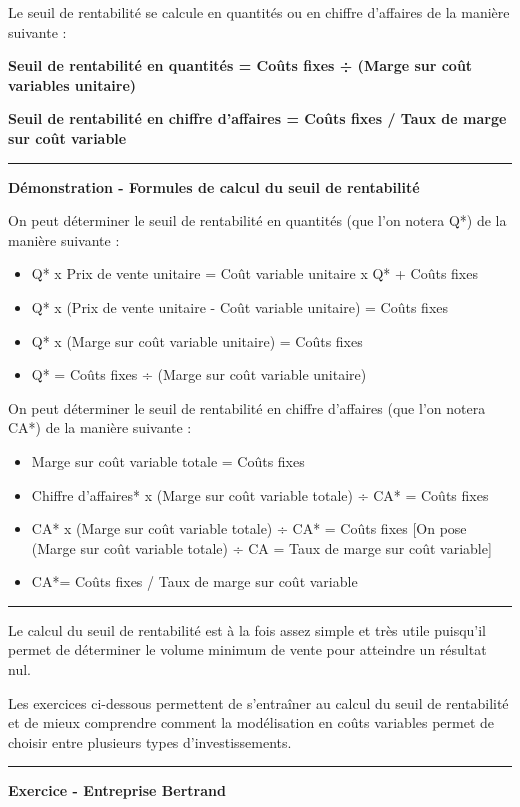 \documentclass[oneside]{kaobook}
\begin{document}
Le seuil de rentabilité se calcule en quantités ou en chiffre d'affaires de la manière suivante :
\begin{center}
\textbf{Seuil de rentabilité en quantités  =  Coûts fixes ÷ (Marge sur coût variables unitaire)}

\textbf{Seuil de rentabilité en chiffre d'affaires = Coûts fixes / Taux de marge sur coût variable}
\end{center}

\noindent\rule{\textwidth}{0.5pt}
\textbf{Démonstration -  Formules de calcul du seuil de rentabilité}

On peut déterminer le seuil de rentabilité en quantités (que l'on notera Q*) de la manière suivante :
\begin{itemize}
\item Q* x Prix de vente unitaire = Coût variable unitaire x Q* + Coûts fixes
\item Q* x (Prix de vente unitaire - Coût variable unitaire) =  Coûts fixes
\item Q* x (Marge sur coût variable unitaire) =  Coûts fixes
\item Q* =  Coûts fixes ÷ (Marge sur coût variable unitaire)
\end{itemize}
On peut déterminer le seuil de rentabilité en chiffre d'affaires (que l'on notera CA*) de la manière suivante :
\begin{itemize}
\item Marge sur coût variable totale =  Coûts fixes
\item Chiffre d'affaires* x (Marge sur coût variable totale) ÷ CA* =  Coûts fixes
\item CA* x (Marge sur coût variable totale) ÷ CA* =  Coûts fixes [On pose (Marge sur coût variable totale) ÷ CA = Taux de marge sur coût variable]
\item CA*= Coûts fixes / Taux de marge sur coût variable
\end{itemize}

\noindent\rule{\textwidth}{0.5pt}

Le calcul du seuil de rentabilité est à la fois assez simple et très utile puisqu'il permet de déterminer le volume minimum de vente pour atteindre un résultat nul.

Les exercices ci-dessous permettent de s'entraîner au calcul du seuil de rentabilité et de mieux comprendre comment la modélisation en coûts variables permet de choisir entre plusieurs types d'investissements.

\noindent\rule{\textwidth}{0.5pt}
\textbf{Exercice - Entreprise Bertrand}
\end{document}
